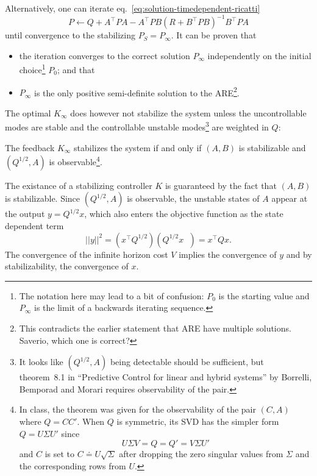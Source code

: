 Alternatively, one can iterate eq.~\eqref{eq:solution-timedependent-ricatti}
\begin{equation}
  \label{eq:solution-timeindependent-ricatti-iterate}
  P \leftarrow Q + A^\top PA - A^\top PB\left(R+B^\top PB\right)^{-1}B^\top PA
\end{equation}
until convergence to the stabilizing $P_S = P_\infty$. It can be proven that
\begin{itemize}
\item the iteration converges to the correct solution $P_\infty$ independently on the initial choice\footnote{The notation here may lead to a bit of confusion: $P_0$ is the starting value and $P_\infty$ is the limit of a backwards iterating sequence.} $P_0$; and that
\item $P_\infty$ is the only positive semi-definite solution to the ARE\footnote{This contradicts the earlier statement that ARE have multiple solutions. Saverio, which one is correct?}.
\end{itemize}

The optimal $K_\infty$ does however not stabilize the system unless the uncontrollable modes are stable and the controllable unstable modes\footnote{It looks like $(Q^{1/2},A)$ being detectable should be sufficient, but theorem~8.1 in ``Predictive Control for linear and hybrid systems'' by Borrelli, Bemporad and Morari requires observability of the pair.} are weighted in $Q$:
\begin{theorem}
  The feedback $K_\infty$ stabilizes the system if and only if $(A,B)$ is stabilizable and $(Q^{1/2},A)$ is observable\footnote{In class, the theorem was given for the observability of the pair $(C,A)$ where $Q=CC'$. When $Q$ is symmetric, its SVD has the simpler form $Q = U\Sigma U'$ since
    \begin{equation*}
      U\Sigma V = Q = Q' = V\Sigma U'
    \end{equation*}
    and $C$ is set to $C \doteq U\sqrt{\Sigma}$ after dropping the zero singular values from $\Sigma$ and the corresponding rows from $U$.}.
\end{theorem}
The existance of a stabilizing controller $K$ is guaranteed by the fact that $(A,B)$ is stabilizable. Since $(Q^{1/2},A)$ is observable, the unstable states of $A$ appear at the output $y=Q^{1/2}x$, which also enters the objective function as the state dependent term
\begin{equation*}
  ||y||^2 = \left(x^\top Q^{1/2}\right)\left(Q^{1/2} x^{\phantom{\top}}\right) = x^\top Qx.
\end{equation*}
The convergence of the infinite horizon cost $V$ implies the convergence of $y$ and by stabilizability, the convergence of $x$.


